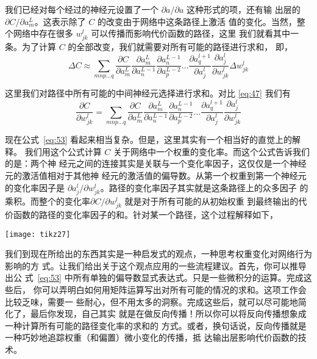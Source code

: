 我们已经对每个经过的神经元设置了一个 $\partial a/\partial a$ 这种形式的项，还有输
出层的 $\partial C/\partial a_m^L$。这表示除了 $C$ 的改变由于网络中这条路径上激活
值的变化。当然，整个网络中存在很多 $w_{jk}^l$ 可以传播而影响代价函数的路径，这里
我们就看其中一条。为了计算 $C$ 的全部改变，我们就需要对所有可能的路径进行求和，
即，
\begin{equation}
  \Delta C \approx \sum_{mnp\ldots q} \frac{\partial C}{\partial a^L_m}
  \frac{\partial a^L_m}{\partial a^{L-1}_n} \frac{\partial a^{L-1}_n}{\partial
    a^{L-2}_p} \ldots \frac{\partial a^{l+1}_q}{\partial a^l_j} \frac{\partial
    a^l_j}{\partial w^l_{jk}} \Delta w^l_{jk}
  \label{eq:52}\tag{52}
\end{equation}

这里我们对路径中所有可能的中间神经元选择进行求和。对比 \eqref{eq:47} 我们有
\begin{equation}
  \frac{\partial C}{\partial w^l_{jk}} = \sum_{mnp\ldots q} \frac{\partial
    C}{\partial a^L_m} \frac{\partial a^L_m}{\partial a^{L-1}_n} \frac{\partial
    a^{L-1}_n}{\partial a^{L-2}_p} \ldots \frac{\partial a^{l+1}_q}{\partial
    a^l_j} \frac{\partial a^l_j}{\partial w^l_{jk}}
\label{eq:53}\tag{53}
\end{equation}

现在公式~\eqref{eq:53} 看起来相当复杂。但是，这里其实有一个相当好的直觉上的解释。
我们用这个公式计算 $C$ 关于网络中一个权重的变化率。而这个公式告诉我们的是：两个神
经元之间的连接其实是关联与一个变化率因子，这仅仅是一个神经元的激活值相对于其他神
经元的激活值的偏导数。从第一个权重到第一个神经元的变化率因子是
$\partial a_j^l/\partial w_{jk}^l$。路径的变化率因子其实就是这条路径上的众多因子
的乘积。而整个的变化率$\partial C/\partial w_{jk}^l$ 就是对于所有可能的从初始权重
到最终输出的代价函数的路径的变化率因子的和。针对某一个路径，这个过程解释如下，

\begin{center}
  \texttt{[image: tikz27]}
\end{center}

我们到现在所给出的东西其实是一种启发式的观点，一种思考权重变化对网络行为影响的方
式。让我们给出关于这个观点应用的一些流程建议。首先，你可以推导出公
式~\eqref{eq:53} 中所有单独的偏导数显式表达式。只是一些微积分的运算。完成这些后，
你可以弄明白如何用矩阵运算写出对所有可能的情况的求和。这项工作会比较乏味，需要一
些耐心，但不用太多的洞察。完成这些后，就可以尽可能地简化了，最后你发现，自己其实
就是在做反向传播！所以你可以将反向传播想象成一种计算所有可能的路径变化率的求和的
方式。或者，换句话说，反向传播就是一种巧妙地追踪权重（和偏置）微小变化的传播，抵
达输出层影响代价函数的技术。

